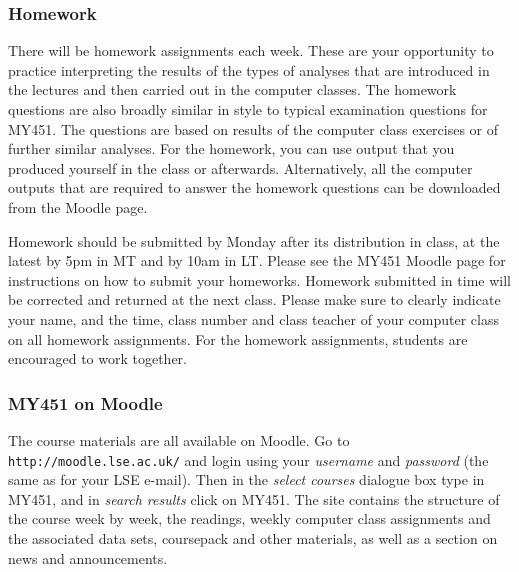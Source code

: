 


\subsubsection{Homework}
\vspace*{-1.5ex}
There will be homework assignments each week. These are your opportunity
to practice interpreting the results of the types of analyses that are introduced in
the lectures and then carried out in the computer classes. The homework questions
are also broadly similar in style to typical examination questions for
MY451. The questions are based on results of the computer class
exercises or of further similar analyses. For the homework, you can
use output that you produced yourself in the class or afterwards.
Alternatively, all the computer outputs that are
required to answer the homework questions can be downloaded from the
Moodle page.

Homework should be submitted by Monday after its distribution in class, at the latest
by 5pm in MT and by 10am in LT. Please see the MY451 Moodle page for
instructions on how to submit your homeworks.
Homework submitted in time will be corrected and returned at the next
class. Please make sure to clearly indicate your name, and the time,
class number and class teacher of your computer class on all homework
assignments. For the homework assignments, students are
encouraged to work together.

\subsubsection{MY451 on Moodle}
\label{sss_moodle}
The course materials are all available on Moodle. Go to
\texttt{http://moodle.lse.ac.uk/} and login using your \emph{username}
and \emph{password} (the same as for your LSE e-mail). Then in the
\emph{select courses} dialogue box type in MY451, and in \emph{search
results} click on MY451. The site contains the structure of the course
week by week, the readings, weekly computer class assignments and the
associated data sets, coursepack and other materials, as well as a
section on news and announcements.

